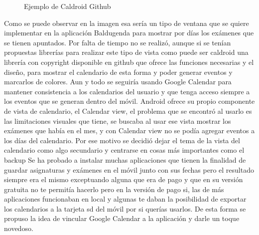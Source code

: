 \begin{figure}[H] 
  \begin{center} 
    \caption{Ejemplo de Caldroid Github} 
    \label{fig:Caldroid} 
  \end{center} 
\end{figure}

Como se puede observar en la imagen esa sería un tipo de ventana que se quiere implementar en la aplicación Baldugenda para mostrar por días los exámenes que se tienen apuntados.
Por falta de tiempo no se realizó, aunque si se tenían propuestas librerías para realizar este tipo de vista como puede ser caldroid una librería con copyright disponible en github que ofrece las funciones necesarias y el diseño, para mostrar el calendario de esta forma y poder generar eventos y marcarlos de colores.
Aun y todo se seguiría usando Google Calendar para mantener consistencia a los calendarios del usuario y que tenga acceso siempre a los eventos que se generan dentro del móvil.
Android ofrece su propio componente de vista de calendario, el Calendar view, el problema que se encontró al usarlo es las limitaciones visuales que tiene, se buscaba al usar ese vista mostrar los exámenes que había en el mes, y con Calendar view no se podía agregar eventos a los días del calendario.
Por ese motivo se decidió dejar el tema de la vista del calendario como algo secundario y centrarse en cosas más importantes como el backup
Se ha probado a instalar muchas aplicaciones que tienen la finalidad de guardar asignaturas y exámenes en el móvil junto con sus fechas pero el resultado siempre era el mismo exceptuando alguna que era de pago y que en su versión gratuita no te permitía hacerlo pero en la versión de pago si, las de más aplicaciones funcionaban en local y algunas te daban la posibilidad de exportar los calendarios a la tarjeta sd del móvil por si querías usarlos.
De esta forma se propuso la idea de vincular Google Calendar a la aplicación y darle un toque novedoso.

